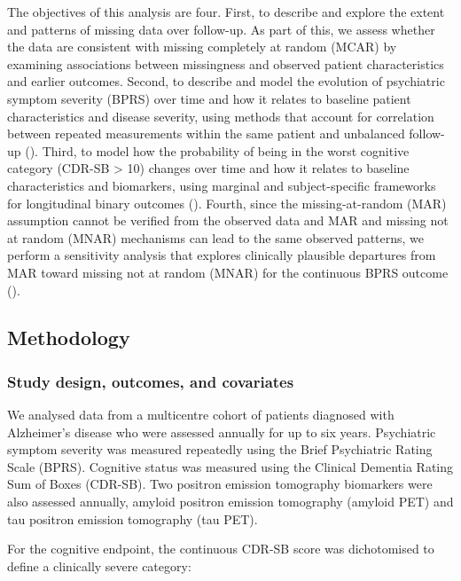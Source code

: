 \documentclass[
  9pt,
  letterpaper,
  DIV=11,
  numbers=noendperiod]{scrartcl}
\begin{document}
The objectives of this analysis are four. First, to describe and explore
the extent and patterns of missing data over follow-up. As part of this,
we assess whether the data are consistent with missing completely at
random (MCAR) by examining associations between missingness and observed
patient characteristics and earlier outcomes. Second, to describe and
model the evolution of psychiatric symptom severity (BPRS) over time and
how it relates to baseline patient characteristics and disease severity,
using methods that account for correlation between repeated measurements
within the same patient and unbalanced follow-up
(). Third, to model
how the probability of being in the worst cognitive category (CDR-SB
\textgreater{} 10) changes over time and how it relates to baseline
characteristics and biomarkers, using marginal and subject-specific
frameworks for longitudinal binary outcomes
(). Fourth,
since the missing-at-random (MAR) assumption cannot be verified from the
observed data and MAR and missing not at random (MNAR) mechanisms can
lead to the same observed patterns, we perform a sensitivity analysis
that explores clinically plausible departures from MAR toward missing
not at random (MNAR) for the continuous BPRS outcome
().

\subsection{Methodology}\label{methodology}

\subsubsection{Study design, outcomes, and
covariates}\label{study-design-outcomes-and-covariates}

We analysed data from a multicentre cohort of patients diagnosed with
Alzheimer's disease who were assessed annually for up to six years.
Psychiatric symptom severity was measured repeatedly using the Brief
Psychiatric Rating Scale (BPRS). Cognitive status was measured using the
Clinical Dementia Rating Sum of Boxes (CDR-SB). Two positron emission
tomography biomarkers were also assessed annually, amyloid positron
emission tomography (amyloid PET) and tau positron emission tomography
(tau PET).

For the cognitive endpoint, the continuous CDR-SB score was dichotomised
to define a clinically severe category:
\end{document}
